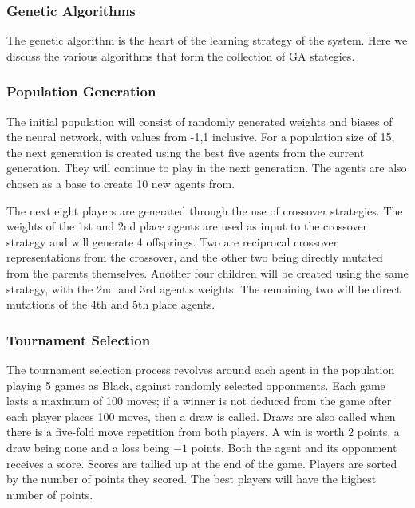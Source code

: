 \documentclass[12pt,a4paper]{article}
\begin{document}
    
    

\subsubsection{Genetic Algorithms} 

    The genetic algorithm is the heart of the learning strategy of the system. Here we discuss the various algorithms that form the collection of GA stategies.

\subsubsection{Population Generation}

    The initial population will consist of randomly generated weights and biases of the neural network, with values from -1,1 inclusive. For a population size of 15, the next generation is created using the best five agents from the current generation. They will continue to play in the next generation. The agents are also chosen as a base to create 10 new agents from.

    The next eight players are generated through the use of crossover strategies. The weights of the 1st and 2nd place agents are used as input to the crossover strategy and will generate 4 offsprings. Two are reciprocal crossover representations from the crossover, and the other two being directly mutated from the parents themselves. Another four children will be created using the same strategy, with the 2nd and 3rd agent's weights.
    The remaining two will be direct mutations of the 4th and 5th place agents.

\subsubsection{Tournament Selection}

    The tournament selection process revolves around each agent in the population playing 5 games as Black, against randomly selected opponments. Each game lasts a maximum of 100 moves; if a winner is not deduced from the game after each player places 100 moves, then a draw is called. Draws are also called when there is a five-fold move repetition from both players. A win is worth $2$ points, a draw being none and a loss being $-1$ points. Both the agent and its opponment receives a score. Scores are tallied up at the end of the game. Players are sorted by the number of points they scored. The best players will have the highest number of points.
\end{document}
